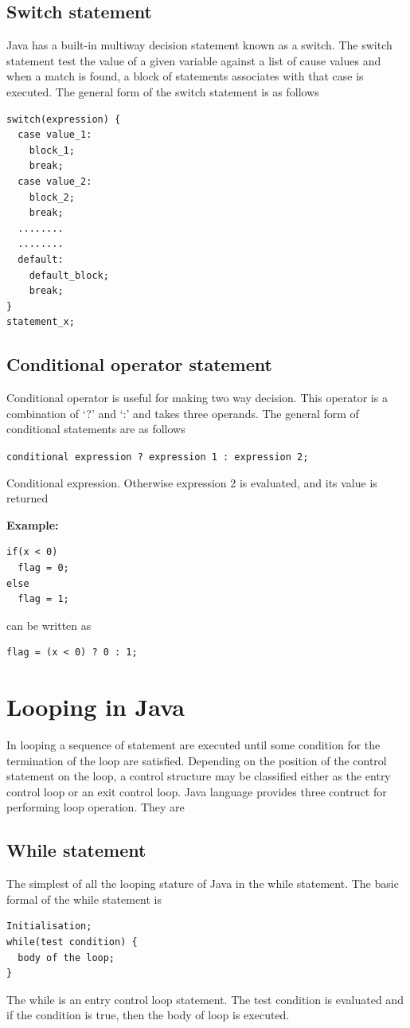 \documentclass[twocolumn, a4paper]{article}
\begin{document}
\subsection{Switch statement}
Java has a built-in multiway decision statement known as a switch. The switch
statement test the value of a given variable against a list of cause values
and when a match is found, a block of statements associates with that case is
executed. The general form of the switch statement is as follows
\begin{lstlisting}
switch(expression) {
  case value_1:
    block_1;
    break;
  case value_2:
    block_2;
    break;
  ........
  ........
  default:
    default_block;
    break;
}
statement_x;
\end{lstlisting}

\subsection{Conditional operator statement}
Conditional operator is useful for making two way decision. This operator is a
combination of `?' and `:' and takes three operands. The general form of
conditional statements are as follows

\noindent\texttt{conditional expression ? expression 1 : expression 2;}

Conditional expression. Otherwise expression 2 is evaluated, and its value is
returned

\vskip10pt
\noindent\textbf{Example:}
\begin{lstlisting}
if(x < 0)
  flag = 0;
else
  flag = 1;
\end{lstlisting}
can be written as
\begin{lstlisting}
flag = (x < 0) ? 0 : 1;
\end{lstlisting}

\section{Looping in Java}
In looping a sequence of statement are executed until some condition for the
termination of the loop are satisfied. Depending on the position of the
control statement on the loop, a control structure may be classified either as
the entry control loop or an exit control loop. Java language provides three
contruct for performing loop operation. They are

\subsection{While statement}
The simplest of all the looping stature of Java in the while statement. The
basic formal of the while statement is
\begin{lstlisting}
Initialisation;
while(test condition) {
  body of the loop;
}
\end{lstlisting}
The while is an entry control loop statement. The test condition is evaluated
and if the condition is true, then the body of loop is executed.
\end{document}
